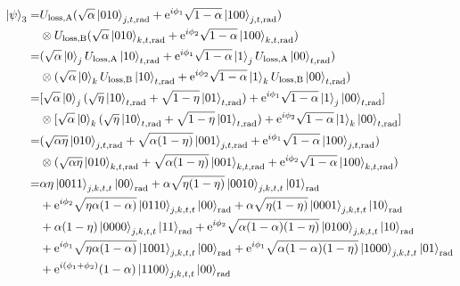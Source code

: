 \begin{subequations}
    \begin{align}
        \ket{\psi}_{3}=& U_{\text{loss,A}}(\sqrt{\alpha}\ket{010}_{j,t,\text{rad}} + \text{e}^{i\phi_{1}}\sqrt{1-\alpha}\ket{100}_{j,t,\text{rad}})\nonumber\\
        &\otimes U_{\text{loss,B}}(\sqrt{\alpha}\ket{010}_{k,t,\text{rad}} + \text{e}^{i\phi_{2}}\sqrt{1-\alpha}\ket{100}_{k,t,\text{rad}})\\
        =& (\sqrt{\alpha}\ket{0}_{j}U_{\text{loss,A}}\ket{10}_{t,\text{rad}} + \text{e}^{i\phi_{1}}\sqrt{1-\alpha}\ket{1}_{j}U_{\text{loss,A}}\ket{00}_{t,\text{rad}})\nonumber\\
        &\otimes(\sqrt{\alpha}\ket{0}_{k}U_{\text{loss,B}}\ket{10}_{t,\text{rad}} + \text{e}^{i\phi_{2}}\sqrt{1-\alpha}\ket{1}_{k}U_{\text{loss,B}}\ket{00}_{t,\text{rad}}) \\
        =& [\sqrt{\alpha}\ket{0}_{j}(\sqrt{\eta}\ket{10}_{t,\text{rad}} + \sqrt{1-\eta}\ket{01}_{t,\text{rad}}) + \text{e}^{i\phi_{1}}\sqrt{1-\alpha}\ket{1}_{j}\ket{00}_{t,\text{rad}}]\nonumber\\
        &\otimes[\sqrt{\alpha}\ket{0}_{k}(\sqrt{\eta}\ket{10}_{t,\text{rad}} + \sqrt{1-\eta}\ket{01}_{t,\text{rad}}) + \text{e}^{i\phi_{2}}\sqrt{1-\alpha}\ket{1}_{k}\ket{00}_{t,\text{rad}}] \\
        =& (\sqrt{\alpha\eta}\ket{010}_{j,t,\text{rad}} + \sqrt{\alpha(1-\eta)}\ket{001}_{j,t,\text{rad}} + \text{e}^{i\phi_{1}}\sqrt{1-\alpha}\ket{100}_{j,t,\text{rad}}) \nonumber\\
        &\otimes (\sqrt{\alpha\eta}\ket{010}_{k,t,\text{rad}} + \sqrt{\alpha(1-\eta)}\ket{001}_{k,t,\text{rad}} + \text{e}^{i\phi_{2}}\sqrt{1-\alpha}\ket{100}_{k,t,\text{rad}})\\
        =& \alpha\eta\ket{0011}_{j,k,t,t}\ket{00}_{\text{rad}} + \alpha\sqrt{\eta(1-\eta)}\ket{0010}_{j,k,t,t}\ket{01}_{\text{rad}}\nonumber\\
        & + \text{e}^{i\phi_{2}}\sqrt{\eta\alpha(1-\alpha)}\ket{0110}_{j,k,t,t}\ket{00}_{\text{rad}} + \alpha\sqrt{\eta(1-\eta)}\ket{0001}_{j,k,t,t}\ket{10}_{\text{rad}}\nonumber\\
        & + \alpha(1-\eta)\ket{0000}_{j,k,t,t}\ket{11}_{\text{rad}}+ \text{e}^{i\phi_{2}}\sqrt{\alpha(1-\alpha)(1-\eta)}\ket{0100}_{j,k,t,t}\ket{10}_{\text{rad}}\nonumber\\
        & + \text{e}^{i\phi_{1}}\sqrt{\eta\alpha(1-\alpha)}\ket{1001}_{j,k,t,t}\ket{00}_{\text{rad}}+ \text{e}^{i\phi_{1}}\sqrt{\alpha(1-\alpha)(1-\eta)}\ket{1000}_{j,k,t,t}\ket{01}_{\text{rad}}\nonumber\\
        & + \text{e}^{i(\phi_{1}+\phi_{2})}(1-\alpha)\ket{1100}_{j,k,t,t}\ket{00}_{\text{rad}}
    \end{align}
\end{subequations}

